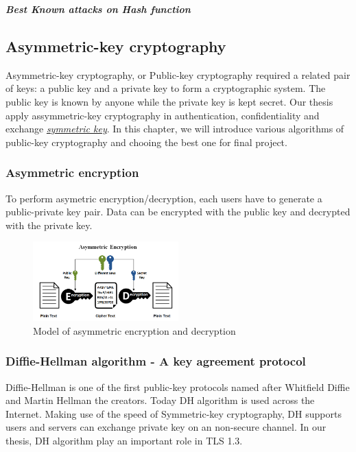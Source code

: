 \bigskip
{\textit {\textbf{Best Known attacks on Hash function}}}

\subsection{Asymmetric-key cryptography}
\label{sec:asymmetric_cryptography}
Asymmetric-key cryptography, or Public-key cryptography required a related pair of keys: a public key and a private key to form a cryptographic system.
The public key is known by anyone while the private key is kept secret. Our thesis apply assymmetric-key cryptography in authentication, confidentiality and exchange \emph{\hyperref[sec: Symmetric_keys]{symmetric key}}.
In this chapter, we will introduce various algorithms of public-key cryptography and chooing the best one for final project.

\subsubsection{Asymmetric encryption}
To perform asymetric encryption/decryption, each users have to generate a public-private key pair.
Data can be encrypted with the public key and decrypted with the private key.

\begin{figure}[ht!]
  \centering
  \includegraphics[width=0.5\textwidth]{images/asymmetric_encrypt.png}
  \caption[Model of asymmetric encryption and decryption]{Model of asymmetric encryption and decryption}
  \label{fig:asymmetric_encrypt}
\end{figure}

\subsubsection{Diffie-Hellman algorithm - A key agreement protocol}
Diffie-Hellman is one of the first public-key protocols named after Whitfield Diffie and Martin Hellman the creators.
Today DH algorithm is used across the Internet.
Making use of the speed of Symmetric-key cryptography, DH supports users and servers can exchange private key on an non-secure channel.
In our thesis, DH algorithm play an important role in TLS 1.3.

